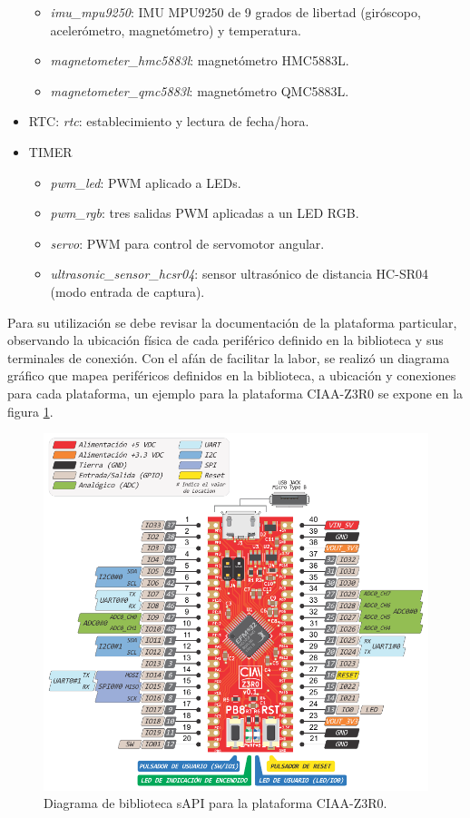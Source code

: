 \begin{itemize}
\begin{itemize}
\item \emph{imu\_mpu9250}: IMU MPU9250 de 9 grados de libertad (giróscopo, acelerómetro, magnetómetro) y temperatura.
\item \emph{magnetometer\_hmc5883l}: magnetómetro HMC5883L. 
\item \emph{magnetometer\_qmc5883l}: magnetómetro QMC5883L.
\end{itemize}
\item
RTC: \emph{rtc}: establecimiento y lectura de fecha/hora.
\item
TIMER
\begin{itemize}
\item \emph{pwm\_led}: PWM aplicado a LEDs.
\item \emph{pwm\_rgb}: tres salidas PWM aplicadas a un LED RGB.
\item \emph{servo}: PWM para control de servomotor angular.
\item \emph{ultrasonic\_sensor\_hcsr04}: sensor ultrasónico de distancia HC-SR04 (modo entrada de captura).
\end{itemize}
\end{itemize}

Para su utilización se debe revisar la documentación de la plataforma particular, observando la ubicación física de cada periférico definido en la biblioteca y sus terminales de conexión. Con el afán de facilitar la labor, se realizó un diagrama gráfico que mapea periféricos definidos en la biblioteca, a ubicación y conexiones para cada plataforma, un ejemplo para la plataforma CIAA-Z3R0 se expone en la figura \ref{fig:mapaSapiBoard}.

\begin{figure}[!htbp]
\begin{center}  %
\includegraphics*[width=14cm]{Figures/mapaSapiBoard.pdf}
\par\caption{Diagrama de biblioteca sAPI para la plataforma CIAA-Z3R0.}\label{fig:mapaSapiBoard}
\end{center}
\end{figure}

